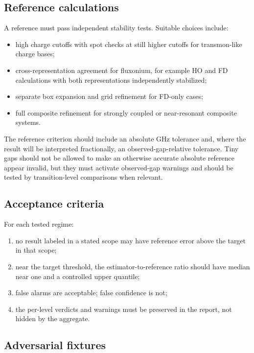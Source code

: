 \documentclass[11pt,a4paper]{article}
\newcommand{\code}[1]{\texttt{\detokenize{#1}}}
\begin{document}
\subsection{Reference calculations}

A reference must pass independent stability tests.  Suitable choices include:
\begin{itemize}
\item high charge cutoffs with spot checks at still higher cutoffs for transmon-like charge bases;
\item cross-representation agreement for fluxonium, for example HO and FD calculations with both representations independently stabilized;
\item separate box expansion and grid refinement for FD-only cases;
\item full composite refinement for strongly coupled or near-resonant composite systems.
\end{itemize}
The reference criterion should include an absolute GHz tolerance and, where the result will be interpreted fractionally, an observed-gap-relative tolerance.  Tiny gaps should not be allowed to make an otherwise accurate absolute reference appear invalid, but they must activate observed-gap warnings and should be tested by transition-level comparisons when relevant.

\subsection{Acceptance criteria}

For each tested regime:
\begin{enumerate}
\item no result labeled \code{likely\_converged} in a stated scope may have reference error above the target in that scope;
\item near the target threshold, the estimator-to-reference ratio should have median near one and a controlled upper quantile;
\item false alarms are acceptable; false confidence is not;
\item the per-level verdicts and warnings must be preserved in the report, not hidden by the aggregate.
\end{enumerate}

\subsection{Adversarial fixtures}
\end{document}
